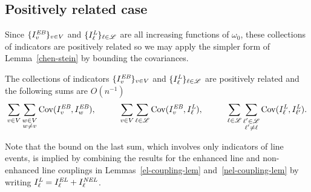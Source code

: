 \subsection*{Positively related case}
Since $\{I^{\text{\em EB}}_{{ v}}\}_{{ v}\in V}$ and $\{I^{\text{\em L}}_{\ell}\}_{\ell\in \mathscr{L}}$ are all increasing functions of $\omega_0$, these collections of indicators are positively related so we may apply the simpler form of Lemma~\ref{chen-stein} by bounding the covariances.
\begin{lemma} 
\label{ebasic-line-lem}
The collections of indicators $\{I^{\text{\em EB}}_{{ v}}\}_{{ v}\in V}$ and $\{I^{\text{\em L}}_{\ell}\}_{\ell\in \mathscr{L}}$ are positively related and the following sums are $O(n^{-1})$
\begin{align*}
\sum_{{ v}\in V} \sum_{\substack{{ w}\in V\\ { w}\neq { v}}} \operatorname{Cov}(I^{\text{\em EB}}_{{ v}},I^{\text{\em EB}}_{{ w}}),
 \hspace{1cm} \sum_{{ v}\in V} \sum_{\ell\in\mathscr{L}} \operatorname{Cov}(I^{\text{\em EB}}_{{ v}},I^{\text{\em L}}_{\ell}),
  \hspace{1cm} \sum_{\ell\in\mathscr{L}} \sum_{\substack{\ell'\in\mathscr{L}\\ \ell'\neq\ell}} \operatorname{Cov}(I^{\text{\em L}}_{\ell},I^{\text{\em L}}_{\ell'}).
\end{align*}
\end{lemma}
Note that the bound on the last sum, which involves only indicators of line events, is implied by combining the results for the enhanced line and non-enhanced line couplings in Lemmas~\ref{el-coupling-lem} and~\ref{nel-coupling-lem} by writing $I^{\text{\em L}}_\ell = I^{\text{\em EL}}_\ell + I^{\text{\em NEL}}_\ell$.

